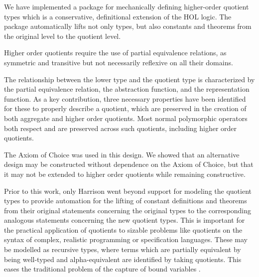 \documentclass[envcountsame,runningheads]{llncs}
\newcommand{\quotient}{partial equivalence}
\begin{document}
We have implemented a package for mechanically defining higher-order
quotient types
which is a conservative, definitional extension of the HOL logic.
The package automatically lifts not only types,
but also constants and theorems from
the original level to the quotient level.

\begin{comment}
\end{comment}
Higher order quotients require
the use of \quotient{} relations,
as symmetric and transitive but not necessarily reflexive on all
their domains.
\begin{comment}
\end{comment}

The relationship between the lower type and the
quotient type
is characterized by the \quotient{} relation, the abstraction function,
and the representation function.
As a key contribution,
three necessary properties have been identified
for these to properly describe a quotient,
which are preserved in the creation of both
aggregate and higher order quotients.
Most normal polymorphic operators both respect and are preserved
across such quotients, including higher order quotients.

The Axiom of Choice was used in this design.  We showed that an alternative
design may be constructed without dependence on the Axiom of Choice, but that
it may not be extended to higher order quotients while remaining constructive.

Prior to this work, only Harrison
\cite{Har98} went beyond
support for modeling the quotient types
to provide automation for the lifting of constant definitions
and theorems from their original statements concerning
the original types to the corresponding analogous statements
concerning the new quotient types.  This is important
for the practical application of quotients to sizable problems like
quotients on
the syntax of
complex,
realistic programming or specification
languages.
These may be modelled
as recursive types, where
terms which are
partially equivalent by being
well-typed and alpha-equivalent
are identified by taking quotients.
This eases the traditional problem of the capture of bound variables
\cite{GoMe96}.
\end{document}
